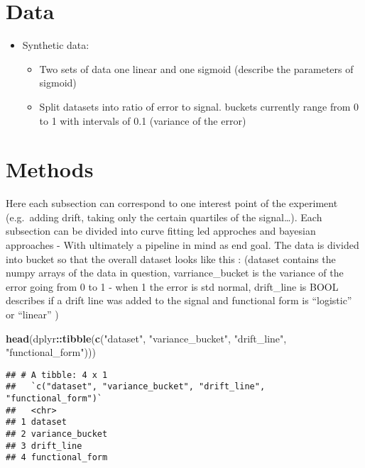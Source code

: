 \documentclass[]{article}
\newenvironment{Shaded}{\begin{snugshade}}{\end{snugshade}}
\newcommand{\KeywordTok}[1]{\textcolor[rgb]{0.13,0.29,0.53}{\textbf{#1}}}
\newcommand{\NormalTok}[1]{#1}
\newcommand{\OperatorTok}[1]{\textcolor[rgb]{0.81,0.36,0.00}{\textbf{#1}}}
\newcommand{\StringTok}[1]{\textcolor[rgb]{0.31,0.60,0.02}{#1}}
\providecommand{\tightlist}{%
  \setlength{\itemsep}{0pt}\setlength{\parskip}{0pt}}
\begin{document}
\hypertarget{data}{%
\section{Data}\label{data}}

\begin{itemize}
\tightlist
\item
  Synthetic data:

  \begin{itemize}
  \tightlist
  \item
    Two sets of data one linear and one sigmoid (describe the parameters
    of sigmoid)
  \item
    Split datasets into ratio of error to signal. buckets currently
    range from 0 to 1 with intervals of 0.1 (variance of the error)
  \end{itemize}
\end{itemize}

\hypertarget{methods}{%
\section{Methods}\label{methods}}

Here each subsection can correspond to one interest point of the
experiment (e.g.~adding drift, taking only the certain quartiles of the
signal\ldots{}). Each subsection can be divided into curve fitting led
approches and bayesian approaches - With ultimately a pipeline in mind
as end goal. The data is divided into bucket so that the overall dataset
looks like this : (dataset contains the numpy arrays of the data in
question, varriance\_bucket is the variance of the error going from 0 to
1 - when 1 the error is std normal, drift\_line is BOOL describes if a
drift line was added to the signal and functional form is ``logistic''
or ``linear'' )

\begin{Shaded}
\begin{Highlighting}[]
\KeywordTok{head}\NormalTok{(dplyr}\OperatorTok{::}\KeywordTok{tibble}\NormalTok{(}\KeywordTok{c}\NormalTok{(}\StringTok{"dataset"}\NormalTok{, }\StringTok{"variance_bucket"}\NormalTok{, }\StringTok{"drift_line"}\NormalTok{, }\StringTok{"functional_form"}\NormalTok{)))}
\end{Highlighting}
\end{Shaded}

\begin{verbatim}
## # A tibble: 4 x 1
##   `c("dataset", "variance_bucket", "drift_line", "functional_form")`
##   <chr>                                                             
## 1 dataset                                                           
## 2 variance_bucket                                                   
## 3 drift_line                                                        
## 4 functional_form
\end{verbatim}
\end{document}

